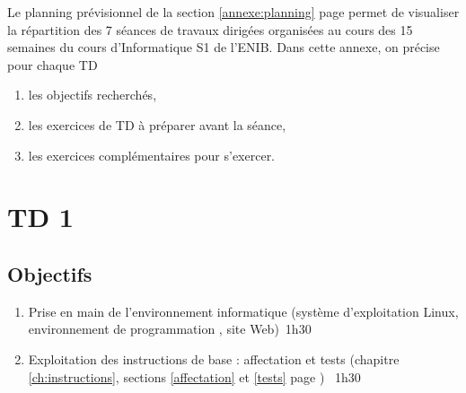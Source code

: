 
Le planning prévisionnel de la section \ref{annexe:planning} 
page \pageref{annexe:planning} permet de visualiser
la répartition des 7 séances de travaux dirigées organisées
au cours des 15 semaines du cours d'Informatique S1 de l'ENIB.
Dans cette annexe, on précise pour chaque TD
\begin{enumerate}
\item les objectifs recherchés,
\item les exercices de TD à préparer avant la séance,
\item les exercices complémentaires pour s'exercer.
\end{enumerate}

\section*{TD 1}\label{td1}
\subsection*{Objectifs}
\begin{enumerate}
\item Prise en main de l'environnement informatique 
	(système d'exploitation {\sc Linux}, environnement de 
	programmation \python, site {\sc Web})\dotfill\ {\color{blue}1h30}\mbox{}\linebreak
\item Exploitation des instructions de base : 
	affectation et tests 
	(chapitre \ref{ch:instructions}, sections \ref{affectation} et 
	\ref{tests} page \pageref{tests})
	\dotfill\ {\color{blue}1h30}\mbox{}
\end{enumerate}

